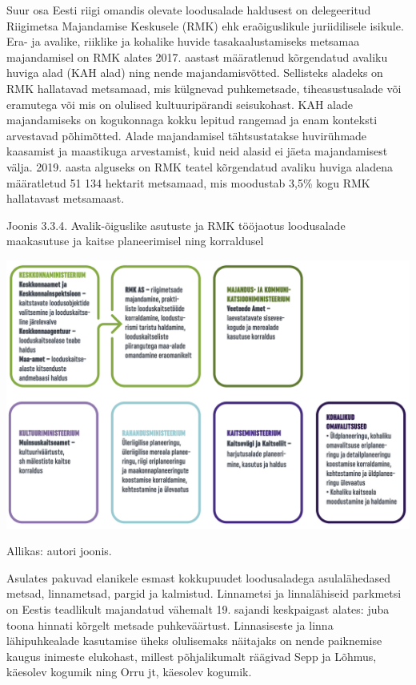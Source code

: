\documentclass[estonian,]{article}
\begin{document}
Suur osa Eesti riigi omandis olevate loodusalade haldusest on delegeeritud Riigimetsa Majandamise Keskusele (RMK) ehk eraõiguslikule juriidilisele isikule. Era- ja avalike, riiklike ja kohalike huvide tasakaalustamiseks metsamaa majandamisel on RMK alates 2017. aastast määratlenud kõrgendatud avaliku huviga alad (KAH alad) ning nende majandamisvõtted. Sellisteks aladeks on RMK hallatavad metsamaad, mis külgnevad puhkemetsade, tiheasustusalade või eramutega või mis on olulised kultuuripärandi seisukohast. KAH alade majandamiseks on kogukonnaga kokku lepitud rangemad ja enam konteksti arvestavad põhimõtted. Alade majandamisel tähtsustatakse huvirühmade kaasamist ja maastikuga arvestamist, kuid neid alasid ei jäeta majandamisest välja. 2019. aasta alguseks on RMK teatel kõrgendatud avaliku huviga aladena määratletud 51 134 hektarit metsamaad, mis moodustab 3,5\% kogu RMK hallatavast metsamaast.

{Joonis 3.3.4.} Avalik-õiguslike asutuste ja RMK tööjaotus loodusalade maakasutuse ja kaitse planeerimisel ning korraldusel

\begin{center}\includegraphics[width=1\linewidth]{figures/3-chapter/fig334} \end{center}

\begin{imgsource}
{Allikas:} autori joonis.
\end{imgsource}

Asulates pakuvad elanikele esmast kokkupuudet loodusaladega asulalähedased metsad, linnametsad, pargid ja kalmistud. Linnametsi ja linnalähiseid parkmetsi on Eestis teadlikult majandatud vähemalt 19. sajandi keskpaigast alates: juba toona hinnati kõrgelt metsade puhkeväärtust. Linnasiseste ja linna lähipuhkealade kasutamise üheks olulisemaks näitajaks on nende paiknemise kaugus inimeste elukohast, millest põhjalikumalt räägivad Sepp ja Lõhmus, käesolev kogumik ning Orru jt, käesolev kogumik.
\end{document}
